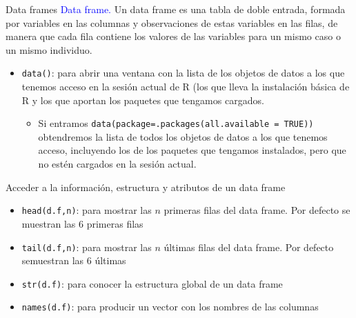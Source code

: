 \documentclass[
  ignorenonframetext,
]{beamer}
\providecommand{\tightlist}{%
  \setlength{\itemsep}{0pt}\setlength{\parskip}{0pt}}
\newcommand\blue[1]{\textcolor{blue}{#1}}
\begin{document}
\begin{frame}[fragile]{Data frames}
\label{data-frames}
\blue{Data frame.} Un data frame es una tabla de doble entrada, formada
por variables en las columnas y observaciones de estas variables en las
filas, de manera que cada fila contiene los valores de las variables
para un mismo caso o un mismo individuo.

\begin{itemize}
\item
  \texttt{data()}: para abrir una ventana con la lista de los objetos de
  datos a los que tenemos acceso en la sesión actual de R (los que lleva
  la instalación básica de R y los que aportan los paquetes que tengamos
  cargados.

  \begin{itemize}
  \tightlist
  \item
    Si entramos \texttt{data(package=.packages(all.available\ =\ TRUE))}
    obtendremos la lista de todos los objetos de datos a los que tenemos
    acceso, incluyendo los de los paquetes que tengamos instalados, pero
    que no estén cargados en la sesión actual.
  \end{itemize}
\end{itemize}
\end{frame}

\begin{frame}[fragile]{Acceder a la información, estructura y atributos
de un data frame}
\label{acceder-a-la-informaciuxf3n-estructura-y-atributos-de-un-data-frame}
\begin{itemize}
\tightlist
\item
  \texttt{head(d.f,n)}: para mostrar las \(n\) primeras filas del data
  frame. Por defecto se muestran las 6 primeras filas
\item
  \texttt{tail(d.f,n)}: para mostrar las \(n\) últimas filas del data
  frame. Por defecto semuestran las 6 últimas
\item
  \texttt{str(d.f)}: para conocer la estructura global de un data frame
\item
  \texttt{names(d.f)}: para producir un vector con los nombres de las
  columnas
\end{itemize}
\end{frame}
\end{document}
